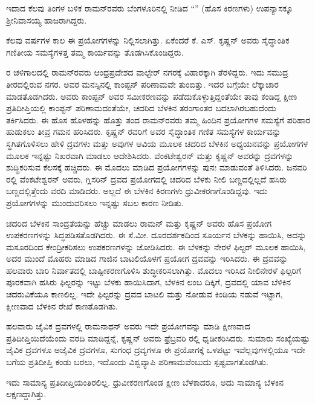 ಇದಾದ ಕೆಲವು ತಿಂಗಳ ಬಳಿಕ ರಾಮನ್‍ರವರು ಬೆಂಗಳೂರಿನಲ್ಲಿ ನೀಡಿದ “” (ಹೊಸ ಕಿರಣಗಳು) ಉಪನ್ಯಾಸಕ್ಕೂ ಶ‍್ರೀನಿವಾಸಯ್ಯ ಹಾಜರಾಗಿದ್ದರು.

ಕೆಲವು ವರ್ಷಗಳ ಕಾಲ ಈ ಪ್ರಯೋಗಗಳನ್ನು ನಿಲ್ಲಿಸಲಾಗಿತ್ತು. ಏಕೆಂದರೆ ಕೆ. ಎಸ್. ಕೃಷ್ಣನ್ ಅವರು ಸೈದ್ಧಾಂತಿಕ ಗಣಿತೀಯ ಸಮಸ್ಯೆಗಳತ್ತ ತಮ್ಮ ಕಾರ್ಯವನ್ನು ತೊಡಗಿಸಿಕೊಂಡಿದ್ದರು.

 ರ ಚಳಿಗಾಲದಲ್ಲಿ ರಾಮನ್‍ರವರು ಆಂಧ್ರಪ್ರದೇಶದ ವಾಲ್ಟೇರ್ ನಗರಕ್ಕೆ ವಿಹಾರಕ್ಕಾಗಿ ತೆರಳಿದ್ದರು. ಇದು ಸಮುದ್ರ ತೀರದಲ್ಲಿರುವ ನಗರ. ಅವರ ಮನಸ್ಸಿನಲ್ಲಿ ಕಾಂಪ್ಟನ್ ಪರಿಣಾಮವೇ ತುಂಬಿತ್ತು. ಇದರ ಬಗ್ಗೆಯೇ ಲೆಕ್ಕಾಚಾರ ಮಾಡತೊಡಗಿದರು. ಅವರು ಕಾಂಪ್ಟನ್ ಅವರ ಸಮೀ\-ಕರಣವನ್ನು ಪಡೆದುಕೊಳ್ಳುತ್ತಿದ್ದಂತೆಯೇ ತಾವು ಕಂಡಿದ್ದ ಕ್ಷೀಣ ಪ್ರತಿದೀಪ್ತಿಯಲ್ಲಿ ಕಾಂಪ್ಟನ್ ಪರಿಣಾಮದಂತೆಯೇ, ಚದರಿದ ಬೆಳಕಿನ ತರಂಗಾಂತರ ಬದಲಾಗಿರಬಹುದೆಂದು ತರ್ಕಿಸಿದರು. ಈ ಹೊಸ ಹೊಳಹನ್ನು ಹೊತ್ತು ತಂದ ರಾಮನ್‍ರವರು ತಮ್ಮ ಹಿಂದಿನ ಪ್ರಯೋಗಗಳ ಸಮಸ್ಯೆಗೆ ಪರಿಹಾರ ಹುಡುಕಲು ತೀವ್ರ ಗಮನ ಹರಿಸಿದರು. ಕೃಷ್ಣನ್ ರವರಿಗೆ ಅವರ ಸೈದ್ಧಾಂತಿಕ ಗಣಿತ ಸಮಸ್ಯೆಗಳ ಕಾರ್ಯವನ್ನು ಸ್ಥಗಿತಗೊಳಿಸಲು ಹೇಳಿ ದ್ರವಗಳು ಮತ್ತು ಅವುಗಳ ಆವಿಯ ಮೂಲಕ ಚದರಿದ ಬೆಳಕಿನ ಅಧ್ಯಯನವನ್ನು ಪ್ರಯೋಗಗಳ ಮೂಲಕ ಇನ್ನಷ್ಟು ನಿಖರವಾಗಿ ಮಾಡಲು ಆದೇಶಿಸಿದರು. ವೆಂಕಟೇಶ್ವರನ್ ಮತ್ತು ಕೃಷ್ಣನ್ ಅವರನ್ನು ದ್ರವಗಳನ್ನು ಶುದ್ಧಿಕರಿಸುವ ಕೆಲಸಕ್ಕೆ ಹಚ್ಚಿದರು. ಈ ಮೊದಲು ಮಾಡಿದ ಪ್ರಯೋಗಗಳನ್ನು ಪುನಃ ಮಾಡುವಂತೆ ತಿಳಿಸಿದರು. ಜನವರಿ ರಲ್ಲಿ ವೆಂಕಟೇಶ್ವರನ್ ಅವರು, ಗ್ಲಿಸರಿನ್ ದ್ರವದ ಪ್ರಯೋಗದಲ್ಲಿ ಚದರಿದ ಬೆಳಕು ನೀಲಿ ಬಣ್ಣದಲ್ಲಿಲ್ಲದೆ ಹಸಿರು ಬಣ್ಣದಲ್ಲಿತ್ತೆಂದು ವರದಿ ಮಾಡಿದರು. ಅಲ್ಲದೆ ಈ ಬೆಳಕಿನ ಕಿರಣಗಳು ಧ್ರುವೀಕರಣಗೊಂಡಿದ್ದವು. ಇದು ಪ್ರಯೋಗಗಳನ್ನು ಮುಂದುವರಿಸಲು ಇನ್ನಷ್ಟು ಸಬಲ ಕಾರಣ ನೀಡಿತು.

ಚದರಿದ ಬೆಳಕಿನ ಸಾಂದ್ರತೆಯನ್ನು ಹೆಚ್ಚು ಮಾಡಲು ರಾಮನ್ ಮತ್ತು ಕೃಷ್ಣನ್ ಅವರು ಹೊಸ ಪ್ರಯೋಗ ಉಪಕರಣಗಳನ್ನು ಸಿದ್ಧಪಡಿಸತೊಡಗಿದರು. ಈ ಸೆ.ಮೀ. ದೂರದರ್ಶಕದಿಂದ ಸೂರ್ಯನ ಬೆಳಕನ್ನು ಹಾಯಿಸಿ, ಅದನ್ನು ಮಸೂರದಿಂದ ಕೇಂದ್ರೀಕರಿಸಲು ಉಪಕರಣಗಳನ್ನು ಜೋಡಿಸಿದರು. ಈ ಬೆಳಕನ್ನು ನೇರಳೆ ಫಿಲ್ಟರ್ ಮೂಲಕ ಹಾಯಿಸಿ, ಅದರ ಮುಂದೆ ಮೊಹರು ಮಾಡಿದ ಗಾಜಿನ ಬಾಟಲಿಯೊಳಗೆ ಪ್ರಯೋಗ ದ್ರವವನ್ನು ಇರಿಸಿದರು. ಈ ದ್ರವವನ್ನು ಹಲವಾರು ಬಾರಿ ನಿರ್ವಾತದಲ್ಲಿ ಬಾಷ್ಪೀಕರಣಗೊಳಿಸಿ ಶುದ್ಧೀಕರಿಸಲಾಗಿತ್ತು. ಮೊದಲು ಇರಿಸಿದ ನೀಲಿ\enginline{-}ನೇರಳೆ ಫಿಲ್ಟರಿಗೆ ಪೂರಕವಾಗಿ ಹಸಿರು ಫಿಲ್ಟರನ್ನು ಇಟ್ಟು ಬೆಳಕು ಹಾಯಿಸಿದಾಗ, ಬೆಳಕಿನ ಲಂಬ ದಿಕ್ಕಿಗೆ, ದ್ರವದಲ್ಲಿ ಯಾವ ಬೆಳಿಕಿನ ಚದರುವಿಕೆಯೂ ಕಾಣಲಿಲ್ಲ. ಇದೇ ಫಿಲ್ಟರನ್ನು ದ್ರವದ ಬಾಟಲಿ ಮತ್ತು ನೋಡುವ ಕಿಂಡಿಯ ನಡುವೆ ಇಟ್ಟಾಗ, ಕ್ಷೀಣವಾದ ಬೆಳಕಿನ ರೇಖೆ ಕಾಣತೊಡಗಿತು.

ಹಲವಾರು ಜೈವಿಕ ದ್ರವಗಳಲ್ಲಿ ರಾಮನಾಥನ್ ಅವರು ಇದೇ ಪ್ರಯೋಗವನ್ನು ಮಾಡಿ ಕ್ಷೀಣವಾದ ಪ್ರತಿದೀಪ್ತಿಯಿದೆಯೆಂದು ವರದಿ ಮಾಡಿದ್ದನ್ನೆ, ಕೃಷ್ಣನ್ ಅವರು ಫ್ರೆಬ್ರವರಿ ರಲ್ಲಿ ಧೃಡೀಕರಿಸಿದರು. ಸುಮಾರು  ಸಂಖ್ಯೆಯಷ್ಟು ಜೈವಿಕ ದ್ರವಗಳೂ ಅಜೈವಿಕ ದ್ರವಗಳೂ, ಸುಗಂಧ ದ್ರವ್ಯಗಳೂ ಈ ಪ್ರಯೋಗಕ್ಕೆ ಒಳಪಟ್ಟು ಇವೆಲ್ಲವುಗಳಲ್ಲಿಯೂ ಇದೇ ಬಗೆಯ ಪ್ರತಿದೀಪ್ತಿ ಕಂಡು ಬರಲು, ಇದೊಂದು ವಿಶ್ವವ್ಯಾಪಿ ಪರಿಣಾಮವೆಂಬುದು ಸ್ಪಷ್ಟವಾಗತೊಡಗಿತು. 

ಇದು ಸಾಮಾನ್ಯ ಪ್ರತಿದೀಪ್ತಿಯಂತಿರಲಿಲ್ಲ. ಧ್ರುವೀಕರಣಗೊಂಡ ಕ್ಷೀಣ ಬೆಳಕಾದರೂ, ಅದು ಸಾಮಾನ್ಯ ಬೆಳಕಿನ ಲಕ್ಷಣದ್ದಾಗಿತ್ತು.

